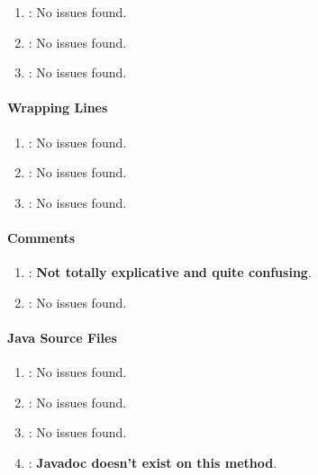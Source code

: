 \begin{enumerate} [resume]
	\item \emph{\checkL}: No issues found.
	\item \emph{\checkM}: No issues found.
	\item \emph{\checkN}: No issues found.
\end{enumerate}

\paragraph{Wrapping Lines} %
\label{par:wrapping_lines}

\begin{enumerate} [resume]
	\item \emph{\checkO}: No issues found.
	\item \emph{\checkP}: No issues found.
	\item \emph{\checkQ}: No issues found.
\end{enumerate}

\paragraph{Comments} %
\label{par:comments}

\begin{enumerate} [resume]
	\item \emph{\checkR}: \textbf{Not totally explicative and quite confusing}.
	\item \emph{\checkS}: No issues found.
\end{enumerate}


\paragraph{Java Source Files} %
\label{par:java_source_files}

\begin{enumerate} [resume]
	\item \emph{\checkT}: No issues found.
	\item \emph{\checkU}: No issues found.
	\item \emph{\checkV}: No issues found.
	\item \emph{\checkW}: \textbf{Javadoc doesn't exist on this method}.
\end{enumerate}

